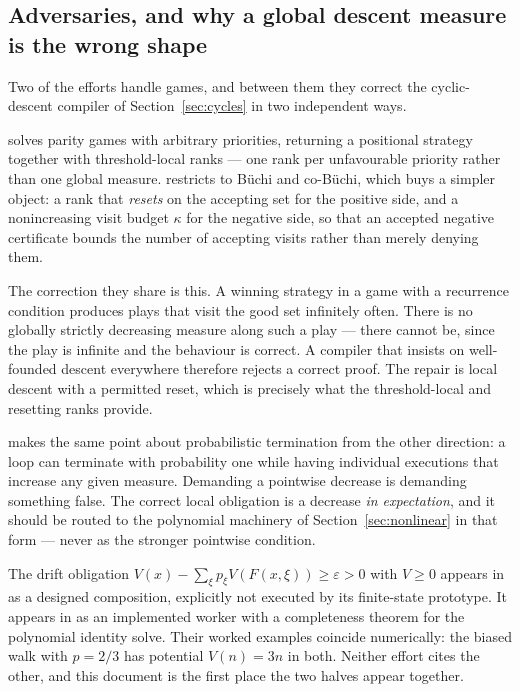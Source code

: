 \subsection{Adversaries, and why a global descent measure is the wrong shape}

Two of the efforts handle games, and between them they correct the
cyclic-descent compiler of Section~\ref{sec:cycles} in two independent ways.

 solves parity games with arbitrary priorities, returning a positional
strategy together with threshold-local ranks --- one rank per unfavourable
priority rather than one global measure.  restricts to B\"uchi and
co-B\"uchi, which buys a simpler object: a rank that \emph{resets} on the
accepting set for the positive side, and a nonincreasing visit budget
$\kappa$ for the negative side, so that an accepted negative certificate
bounds the number of accepting visits rather than merely denying them.

The correction they share is this. A winning strategy in a game with a
recurrence condition produces plays that visit the good set infinitely often.
There is no globally strictly decreasing measure along such a play --- there
cannot be, since the play is infinite and the behaviour is correct. A compiler
that insists on well-founded descent everywhere therefore rejects a correct
proof. The repair is local descent with a permitted reset, which is precisely
what the threshold-local and resetting ranks provide.

 makes the same point about probabilistic termination from the other
direction: a loop can terminate with probability one while having individual
executions that increase any given measure. Demanding a pointwise decrease is
demanding something false. The correct local obligation is a decrease
\emph{in expectation}, and it should be routed to the polynomial machinery of
Section~\ref{sec:nonlinear} in that form --- never as the stronger pointwise
condition.

\begin{remark}
The drift obligation $V(x)-\sum_\xi p_\xi V(F(x,\xi))\ge\varepsilon>0$ with
$V\ge0$ appears in  as a designed composition, explicitly not executed
by its finite-state prototype. It appears in  as an implemented worker
with a completeness theorem for the polynomial identity solve. Their worked
examples coincide numerically: the biased walk with $p=2/3$ has potential
$V(n)=3n$ in both. Neither effort cites the other, and this document is the
first place the two halves appear together.
\end{remark}

